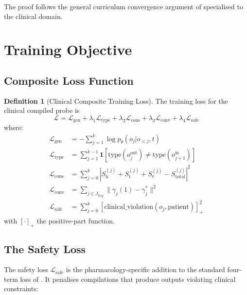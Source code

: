 \documentclass[11pt,twocolumn,a4paper]{article}
\theoremstyle{definition}
\newtheorem{definition}[theorem]{Definition}
\theoremstyle{remark}
\newcommand{\Sk}{S_{\mathrm{k}}}
\newcommand{\St}{S_{\mathrm{t}}}
\newcommand{\Se}{S_{\mathrm{e}}}
\newcommand{\loss}{\mathcal{L}}
\newcommand{\params}{\theta}
\begin{document}
The proof follows the general curriculum convergence argument of \citep{sachikonye2025b} specialised to the clinical domain.

\section{Training Objective}
\label{sec:training_objective}

\subsection{Composite Loss Function}

\begin{definition}[Clinical Composite Training Loss]
\label{def:composite_loss}
The training loss for the clinical compiled probe is
\begin{equation}
\loss = \loss_{\mathrm{gen}} + \lambda_1 \loss_{\mathrm{type}} + \lambda_2 \loss_{\mathrm{cons}} + \lambda_3 \loss_{\mathrm{conv}} + \lambda_4 \loss_{\mathrm{safe}}
\end{equation}
where:
\begin{align}
\loss_{\mathrm{gen}} &= -\sum_{j=1}^{k} \log p_\params(o_j | o_{<j}, t) \\
\loss_{\mathrm{type}} &= \sum_{j=1}^{k-1} \mathbf{1}[\text{type}(o_j^{\mathrm{out}}) \neq \text{type}(o_{j+1}^{\mathrm{in}})] \\
\loss_{\mathrm{cons}} &= \sum_{j=0}^{k} \left|\Sk^{(j)} + \St^{(j)} + \Se^{(j)} - S_{\mathrm{total}}^{(j)}\right|^2 \\
\loss_{\mathrm{conv}} &= \sum_{j \in J_{\mathrm{traj}}} \|\gamma_j(1) - \gamma_j^*\|^2 \\
\loss_{\mathrm{safe}} &= \sum_{j=0}^{k} [\mathrm{clinical\_violation}(o_j, \text{patient})]_+^2
\end{align}
with $[\cdot]_+$ the positive-part function.
\end{definition}

\subsection{The Safety Loss}
\label{sec:safety_loss}

The safety loss $\loss_{\mathrm{safe}}$ is the pharmacology-specific addition to the standard four-term loss of \citep{sachikonye2025b}. It penalises compilations that produce outputs violating clinical constraints:
\end{document}
